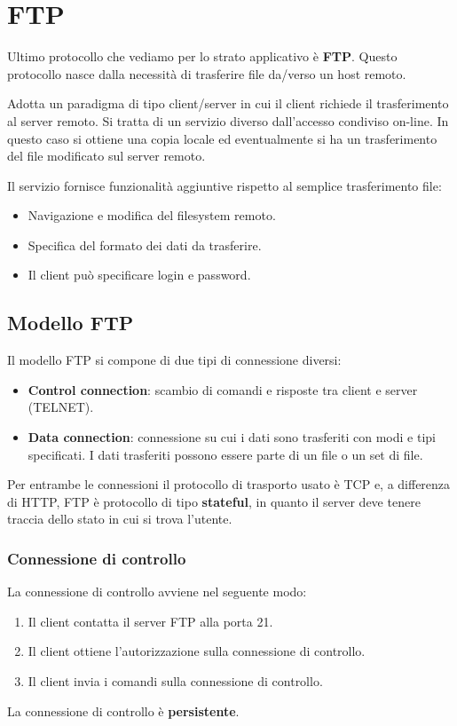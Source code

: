 \section{FTP}
Ultimo protocollo che vediamo per lo strato applicativo è \textbf{FTP}.
Questo protocollo nasce dalla necessità di trasferire file da/verso un
host remoto.

Adotta un paradigma di tipo client/server in cui il client richiede
il trasferimento al server remoto. Si tratta di un servizio diverso
dall'accesso condiviso on-line. In questo caso si ottiene una copia
locale ed eventualmente si ha un trasferimento del file modificato
sul server remoto.

Il servizio fornisce funzionalità aggiuntive rispetto al semplice 
trasferimento file:
\begin{itemize}
	\item Navigazione e modifica del filesystem remoto.
	\item Specifica del formato dei dati da trasferire.
	\item Il client può specificare login e password.
\end{itemize}

\subsection{Modello FTP}
Il modello FTP si compone di due tipi di connessione diversi:
\begin{itemize}
	\item \textbf{Control connection}: scambio di comandi e risposte 
		tra client e server (TELNET).
	\item \textbf{Data connection}: connessione su cui i dati sono 
		trasferiti con modi e tipi specificati. I dati trasferiti 
		possono essere parte di un file o un set di file.
\end{itemize}
Per entrambe le connessioni il protocollo di trasporto usato è TCP e, a
differenza di HTTP, FTP è protocollo di tipo \textbf{stateful}, in 
quanto il server deve tenere traccia dello stato in cui si trova 
l'utente.

\subsubsection{Connessione di controllo}
La connessione di controllo avviene nel seguente modo:
\begin{enumerate}
	\item Il client contatta il server FTP alla porta 21.
	\item Il client ottiene l'autorizzazione sulla connessione di 
		controllo.
	\item Il client invia i comandi sulla connessione di controllo.
\end{enumerate}
La connessione di controllo è \textbf{persistente}.


